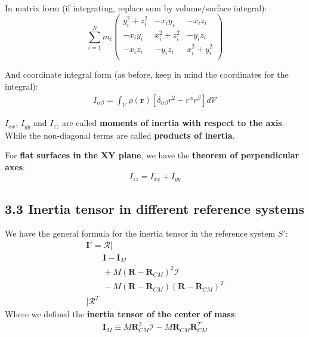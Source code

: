 \documentclass[a4paper,landscape,10pt]{cheatsheet}
\begin{document}
In matrix form (if integrating, replace sum by volume/surface integral):
$$
  \sum_{i=1}^{N}m_i
  \begin{pmatrix*}
    y_i^2 + z_i^2 & -x_i y_i & -x_i z_i \\
    -x_i y_i & x_i^2 + z_i^2 & -y_i z_i \\
    -x_i z_i & -y_i z_i & x_i^2 + y_i^2 \\
  \end{pmatrix*}
$$

And coordinate integral form (as before, keep in mind the coordinates for the integral):
\begin{gather*}
  I_{\alpha\beta} = \int_{\mathcal{V}}\rho(\textbf{r})[\delta_{\alpha\beta}r^2-r^\alpha r^\beta]d\mathcal{V}
\end{gather*}

$I_{xx}$, $I_{yy}$ and $I_{zz}$ are called \textbf{moments of inertia with respect to the axis}. While the non-diagonal
terms are called \textbf{products of inertia}.

For \textbf{flat surfaces in the XY plane}, we have the \textbf{theorem of perpendicular axes}:
$$
  I_{zz} = I_{xx} + I_{yy}
$$



\subsection*{3.3 Inertia tensor in different reference systems}
We have the general formula for the inertia tensor in the reference system $S'$:
\begin{gather*}
  \textbf{I}' = \mathcal{R}[ \\
    \qquad \textbf{I} - \textbf{I}_M \\
    \qquad + M(\textbf{R}-\textbf{R}_{CM})^2\mathcal{I} \\
    \qquad - M(\textbf{R}-\textbf{R}_{CM})(\textbf{R}-\textbf{R}_{CM})^T \\
  ]\mathcal{R}^T
\end{gather*}
Where we defined the \textbf{inertia tensor of the center of mass}:
\begin{gather*}
  \textbf{I}_M \equiv M\textbf{R}_{CM}^2\mathcal{I} - M\textbf{R}_{CM}\textbf{R}_{CM}^T
\end{gather*}
\end{document}
